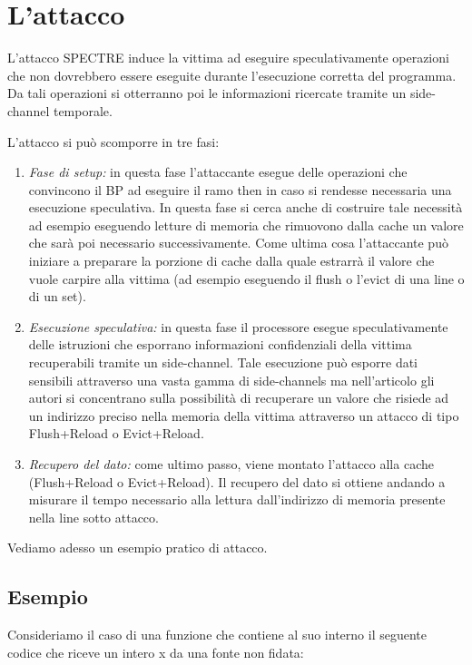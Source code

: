 	\section{L'attacco}
		L'attacco SPECTRE induce la vittima ad eseguire speculativamente operazioni che non dovrebbero essere eseguite durante l'esecuzione corretta del programma. Da tali operazioni si otterranno poi le informazioni ricercate tramite un side-channel temporale.
		
		L'attacco si può scomporre in tre fasi:
		
		\begin{enumerate}
			\item \emph{Fase di setup:} in questa fase l'attaccante esegue delle operazioni che convincono il \ac{BP} ad eseguire il ramo then in caso si rendesse necessaria una esecuzione speculativa. In questa fase si cerca anche di costruire tale necessità ad esempio eseguendo letture di memoria che rimuovono dalla cache un valore che sarà poi necessario successivamente. Come ultima cosa l'attaccante può iniziare a preparare la porzione di cache dalla quale estrarrà il valore che vuole carpire alla vittima (ad esempio eseguendo il flush o l'evict di una line o di un set).
			\item \emph{Esecuzione speculativa:} in questa fase il processore esegue speculativamente delle istruzioni che esporrano informazioni confidenziali della vittima recuperabili tramite un side-channel. Tale esecuzione può esporre dati sensibili attraverso una vasta gamma di side-channels ma nell'articolo gli autori si concentrano sulla possibilità di recuperare un valore che risiede ad un indirizzo preciso nella memoria della vittima attraverso un attacco di tipo Flush+Reload o Evict+Reload.
			\item \emph{Recupero del dato:} come ultimo passo, viene montato l'attacco alla cache (Flush+Reload o Evict+Reload). Il recupero del dato si ottiene andando a misurare il tempo necessario alla lettura dall'indirizzo di memoria presente nella line sotto attacco.
		\end{enumerate}
	
		Vediamo adesso un esempio pratico di attacco.
		
		\subsection{Esempio}
		
			Consideriamo il caso di una funzione che contiene al suo interno il seguente codice che riceve un intero x da una fonte non fidata:
			
